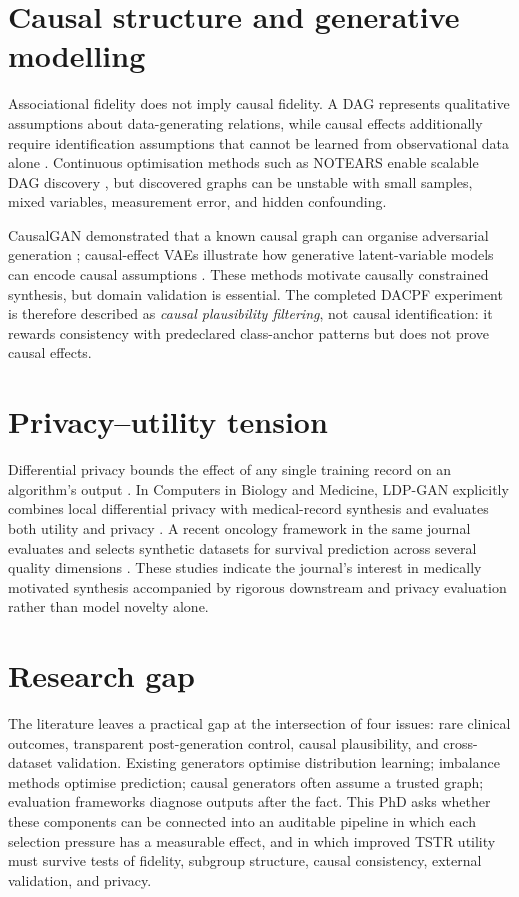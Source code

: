 \section{Causal structure and generative modelling}

Associational fidelity does not imply causal fidelity. A DAG represents qualitative assumptions about data-generating relations, while causal effects additionally require identification assumptions that cannot be learned from observational data alone \citep{pearl2009,spirtes2000}. Continuous optimisation methods such as NOTEARS enable scalable DAG discovery \citep{zheng2018}, but discovered graphs can be unstable with small samples, mixed variables, measurement error, and hidden confounding.

CausalGAN demonstrated that a known causal graph can organise adversarial generation \citep{kocaoglu2018}; causal-effect VAEs illustrate how generative latent-variable models can encode causal assumptions \citep{louizos2017}. These methods motivate causally constrained synthesis, but domain validation is essential. The completed DACPF experiment is therefore described as \emph{causal plausibility filtering}, not causal identification: it rewards consistency with predeclared class-anchor patterns but does not prove causal effects.

\section{Privacy--utility tension}

Differential privacy bounds the effect of any single training record on an algorithm's output \citep{dwork2006}. In Computers in Biology and Medicine, LDP-GAN explicitly combines local differential privacy with medical-record synthesis and evaluates both utility and privacy \citep{kim2024ldpgan}. A recent oncology framework in the same journal evaluates and selects synthetic datasets for survival prediction across several quality dimensions \citep{christoforou2025}. These studies indicate the journal's interest in medically motivated synthesis accompanied by rigorous downstream and privacy evaluation rather than model novelty alone.

\section{Research gap}

The literature leaves a practical gap at the intersection of four issues: rare clinical outcomes, transparent post-generation control, causal plausibility, and cross-dataset validation. Existing generators optimise distribution learning; imbalance methods optimise prediction; causal generators often assume a trusted graph; evaluation frameworks diagnose outputs after the fact. This PhD asks whether these components can be connected into an auditable pipeline in which each selection pressure has a measurable effect, and in which improved TSTR utility must survive tests of fidelity, subgroup structure, causal consistency, external validation, and privacy.

